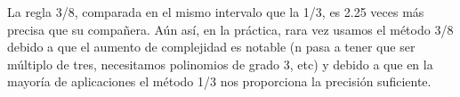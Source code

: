 \documentclass{article}
\begin{document}
			La regla 3/8, comparada en el mismo intervalo que la 1/3, es 2.25 veces más precisa que su compañera. Aún así, en la práctica, rara vez usamos el método 3/8 debido a que el aumento de complejidad es notable (n pasa a tener que ser múltiplo de tres, necesitamos polinomios de grado 3, etc) y debido a que en la mayoría de aplicaciones el método 1/3 nos proporciona la precisión suficiente.\\ 
	
	
	
	
	
	
	
	
	
	
	
	
	
	
	
	
	
	
	
	
	
	
	
	
	
	
	
	
	
	
	
	
	
	
	
	
	
	
	
	
	
	
	
	
	
	
	
	
	
	
	
	
	
	
	
	
	
	
	
	
	
	
	
	
	
	
	
	
	
	
	
	
	
\end{document}
